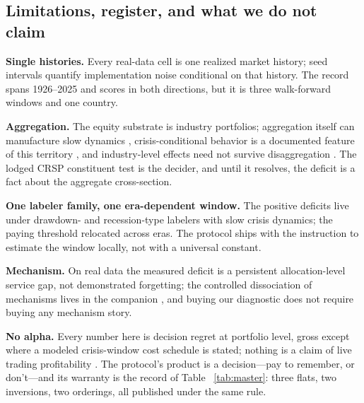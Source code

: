 \documentclass[sigconf,anonymous]{acmart}
\begin{document}
\subsection{Limitations, register, and what we do not claim}
\label{sec:limits}

\textbf{Single histories.} Every real-data cell is one realized market
history; seed intervals quantify implementation noise conditional on
that history. The record spans 1926--2025 and scores in both
directions, but it is three walk-forward windows and one country.

\textbf{Aggregation.} The equity substrate is industry portfolios;
aggregation itself can manufacture slow dynamics \cite{lo1988stock},
crisis-conditional behavior is a documented feature of this territory
\cite{cooper2004market,daniel2016momentum,henkel2011time,
rapach2010out}, and industry-level effects need not survive
disaggregation \cite{grundy2001understanding}. The lodged CRSP
constituent test is the decider, and until it resolves, the deficit is
a fact about the aggregate cross-section.

\textbf{One labeler family, one era-dependent window.} The positive
deficits live under drawdown- and recession-type labelers with slow
crisis dynamics; the paying threshold relocated across eras. The
protocol ships with the instruction to estimate the window locally,
not with a universal constant.

\textbf{Mechanism.} On real data the measured deficit is a persistent
allocation-level service gap, not demonstrated forgetting; the
controlled dissociation of mechanisms lives in the companion
\cite{companion2026}, and buying our diagnostic does not require
buying any mechanism story.

\textbf{No alpha.} Every number here is decision regret at portfolio
level, gross except where a modeled crisis-window cost schedule is
stated; nothing is a claim of live trading profitability
\cite{mclean2016does}. The protocol's product is a decision---pay to
remember, or don't---and its warranty is the record of Table~
\ref{tab:master}: three flats, two inversions, two orderings, all
published under the same rule.



\end{document}
